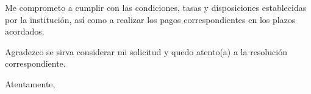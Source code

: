 \documentclass[a4paper,12pt]{article}
\begin{document}
\vspace{0.8cm}

\noindent Me comprometo a cumplir con las condiciones, tasas y disposiciones establecidas por la institución, así como a realizar los pagos correspondientes en los plazos acordados.

\vspace{0.5cm}

\noindent Agradezco se sirva considerar mi solicitud y quedo atento(a) a la resolución correspondiente.

\noindent Atentamente,

\vspace{2.5cm}


\noindent{}  

\noindent{}      

\noindent{}  

\noindent{} 
\end{document}
